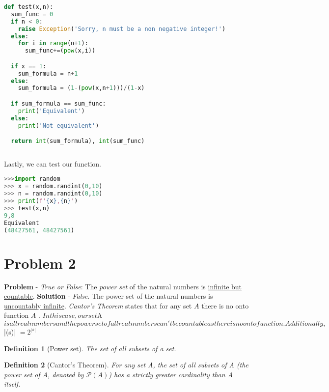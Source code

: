 \documentclass{article}
\newtheorem{definition}{Definition}
\begin{document}
\begin{lstlisting}[language=Python, caption = A function that tests if my function and the mathematical formula to solve this problem are equal]
def test(x,n):
  sum_func = 0
  if n < 0:
    raise Exception('Sorry, n must be a non negative integer!')
  else:
    for i in range(n+1):
      sum_func+=(pow(x,i))

  if x == 1:
    sum_formula = n+1
  else:
    sum_formula = (1-(pow(x,n+1)))/(1-x)

  if sum_formula == sum_func:
    print('Equivalent')
  else:
    print('Not equivalent')

  return int(sum_formula), int(sum_func)
 
\end{lstlisting}
\newline
Lastly, we can test our function.

\begin{lstlisting}[language=Python, caption = Generating random numbers to test my function with]
>>>import random
>>> x = random.randint(0,10)
>>> n = random.randint(0,10)
>>> print(f'{x},{n}')
>>> test(x,n)
9,8
Equivalent
(48427561, 48427561)
\end{lstlisting}



\section{Problem 2}

\textbf{Problem} - \textit{True or False}: The \textit{power set} of the natural numbers is \underline{infinite but countable}.
\newline
\newline
\textbf{Solution} -  \textit{False}. The power set of the natural numbers is \underline{uncountably infinite}. \textit{Cantor's Theorem} states that for any set $A$ there is no onto function $A$ . 
$ In this case, our set $A$ is all real numbers and the power set of all real numbers can't be countable as there is no onto function. Additionally, $ |{(s)}| $= 2^{|s|}$

\begin{definition}[Power set]
The set of all subsets of a set.
\end{definition}

\begin{definition}[Cantor's Theorem]
For any set A, the set of all subsets of A (the power set of A, denoted by ${\mathcal {P}(A)}$) has a strictly greater cardinality than A itself.
\end{definition}
\end{document}

